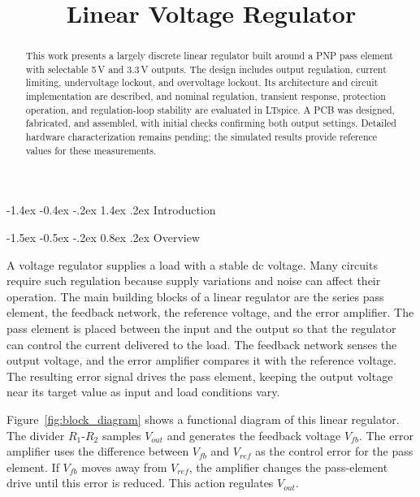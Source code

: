 \documentclass[conference]{IEEEtran}
\title{Linear Voltage Regulator}
\author{
\IEEEauthorblockN{Marcos Verdejo Bosch}
\IEEEauthorblockA{
\faGithub\ \href{\ReportRepositoryURL}{\ReportRepositoryText}
}
}
\makeatletter
\renewcommand\section{\@startsection{section}{1}{\z@}%
  {-1.4ex \@plus -0.4ex \@minus -.2ex}%
  {1.4ex \@plus .2ex}%
  {\normalfont\sffamily\large\bfseries\centering}}
\renewcommand\subsection{\@startsection{subsection}{2}{\z@}%
  {-1.5ex \@plus -0.5ex \@minus -.2ex}%
  {0.8ex \@plus .2ex}%
  {\normalfont\sffamily\normalsize\bfseries}}
\makeatother
\begin{document}
\maketitle

\begin{abstract}
This work presents a largely discrete linear regulator built around a PNP pass element with selectable 5\,V and 3.3\,V outputs. The design includes output regulation, current limiting, undervoltage lockout, and overvoltage lockout. Its architecture and circuit implementation are described, and nominal regulation, transient response, protection operation, and regulation-loop stability are evaluated in LTspice. A PCB was designed, fabricated, and assembled, with initial checks confirming both output settings. Detailed hardware characterization remains pending; the simulated results provide reference values for these measurements.
\end{abstract}


\section{Introduction}

\subsection{Overview}

\noindent A voltage regulator supplies a load with a stable dc voltage. Many circuits require such regulation because supply variations and noise can affect their operation. The main building blocks of a linear regulator are the series pass element, the feedback network, the reference voltage, and the error amplifier. The pass element is placed between the input and the output so that the regulator can control the current delivered to the load. The feedback network senses the output voltage, and the error amplifier compares it with the reference voltage. The resulting error signal drives the pass element, keeping the output voltage near its target value as input and load conditions vary. \cite{razavi_ldo_2019}

Figure~\ref{fig:block_diagram} shows a functional diagram of this linear regulator. The divider \(R_1\)-\(R_2\) samples \(V_{out}\) and generates the feedback voltage \(V_{fb}\). The error amplifier uses the difference between \(V_{fb}\) and \(V_{ref}\) as the control error for the pass element. If \(V_{fb}\) moves away from \(V_{ref}\), the amplifier changes the pass-element drive until this error is reduced. This action regulates \(V_{out}\). \cite{ti_linear_switching_fundamentals}
\end{document}
